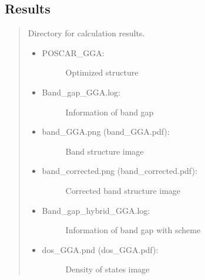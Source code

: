 \documentclass[letterpaper,10pt,english]{sphinxmanual}
\begin{document}
\subsection{Results}
\label{\detokenize{Output/Output:results}}\begin{quote}

Directory for calculation results.
\begin{itemize}
\item {} \begin{description}
\item[{POSCAR\_GGA:}] \leavevmode
Optimized structure

\end{description}

\item {} \begin{description}
\item[{Band\_gap\_GGA.log:}] \leavevmode
Information of band gap

\end{description}

\item {} \begin{description}
\item[{band\_GGA.png (band\_GGA.pdf):}] \leavevmode
Band structure image

\end{description}

\item {} \begin{description}
\item[{band\_corrected.png (band\_corrected.pdf):}] \leavevmode
Corrected band structure image

\end{description}

\item {} \begin{description}
\item[{Band\_gap\_hybrid\_GGA.log:}] \leavevmode
Information of band gap with  scheme

\end{description}

\item {} \begin{description}
\item[{dos\_GGA.pnd (dos\_GGA.pdf):}] \leavevmode
Density of states image

\end{description}


\end{itemize}
\end{quote}
\end{document}
